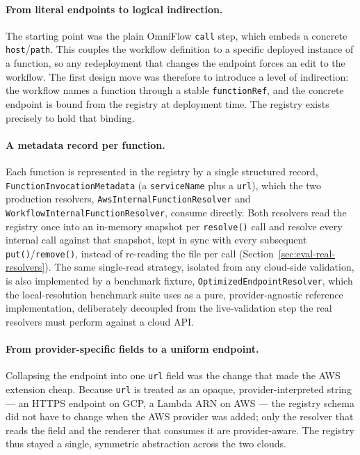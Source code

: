 \paragraph{From literal endpoints to logical indirection.}
The starting point was the plain OmniFlow \texttt{call} step, which embeds a concrete
\texttt{host}/\texttt{path}. This couples the workflow definition to a specific deployed instance
of a function, so any redeployment that changes the endpoint forces an edit to the workflow. The
first design move was therefore to introduce a level of indirection: the workflow names a function
through a stable \texttt{functionRef}, and the concrete endpoint is bound from the registry at
deployment time. The registry exists precisely to hold that binding.

\paragraph{A metadata record per function.}
Each function is represented in the registry by a single structured record,
\texttt{FunctionInvocationMetadata} (a \texttt{serviceName} plus a \texttt{url}), which the two
production resolvers, \texttt{Aws\allowbreak Internal\allowbreak Function\allowbreak Resolver} and
\texttt{Workflow\allowbreak Internal\allowbreak Function\allowbreak Resolver}, consume directly.
Both resolvers read the registry once into an in-memory snapshot per \texttt{resolve()} call and
resolve every internal call against that snapshot, kept in sync with every subsequent
\texttt{put()}/\texttt{remove()}, instead of re-reading the file per call
(Section~\ref{sec:eval-real-resolvers}). The same single-read strategy, isolated from any
cloud-side validation, is also implemented by a benchmark fixture,
\texttt{OptimizedEndpointResolver}, which the local-resolution benchmark suite uses as a pure,
provider-agnostic reference implementation, deliberately decoupled from the live-validation step
the real resolvers must perform against a cloud API.

\paragraph{From provider-specific fields to a uniform endpoint.}
Collapsing the endpoint into one \texttt{url} field was the change that made the AWS extension
cheap. Because \texttt{url} is treated as an opaque, provider-interpreted string --- an HTTPS
endpoint on GCP, a Lambda ARN on AWS --- the registry schema did not have to change when the AWS
provider was added; only the resolver that reads the field and the renderer that consumes it are
provider-aware. The registry thus stayed a single, symmetric abstraction across the two clouds.

